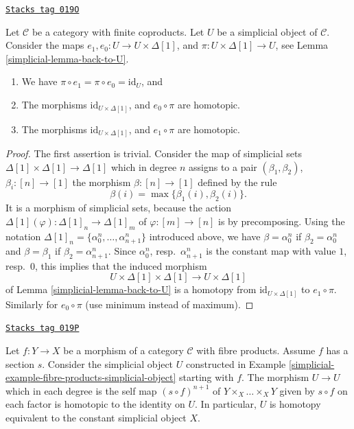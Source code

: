 \begin{lemma}[Contractible]
\label{simplicial-lemma-contractible}
\href{https://stacks.math.columbia.edu/tag/019O}{\texttt{Stacks tag 019O}}

Let $\mathcal{C}$ be a category with finite coproducts.
Let $U$ be a simplicial object of $\mathcal{C}$.
Consider the maps $e_1, e_0 : U \to U \times \Delta[1]$,
and $\pi : U \times \Delta[1] \to U$, see
Lemma \ref{simplicial-lemma-back-to-U}.
\begin{enumerate}
\item We have $\pi \circ e_1 = \pi \circ e_0 = \text{id}_U$, and
\item The morphisms $\text{id}_{U \times \Delta[1]}$,
and $e_0 \circ \pi$ are homotopic.
\item The morphisms $\text{id}_{U \times \Delta[1]}$,
and $e_1 \circ \pi$ are homotopic.
\end{enumerate}
\end{lemma}

\begin{proof}

The first assertion is trivial. Consider the map of simplicial sets
$\Delta[1] \times \Delta[1] \longrightarrow \Delta[1]$
which in degree $n$ assigns to a pair $(\beta_1, \beta_2)$,
$\beta_i : [n] \to [1]$ the morphism
$\beta : [n] \to [1]$ defined by the rule
$$
\beta(i) = \max\{\beta_1(i), \beta_2(i)\}.
$$
It is a morphism of simplicial sets, because the action
$\Delta[1](\varphi) : \Delta[1]_n \to \Delta[1]_m$
of $\varphi : [m] \to [n]$ is by precomposing.
Using the notation $\Delta[1]_n = \{\alpha^n_0, \ldots, \alpha^n_{n + 1}\}$
introduced above, we have $\beta = \alpha^n_0$ if $\beta_2 = \alpha^n_0$
and $\beta = \beta_1$ if $\beta_2 = \alpha^n_{n + 1}$.
Since $\alpha^n_0$, resp.\ $\alpha^n_{n + 1}$ is the constant map
with value $1$, resp.\ $0$, this implies that the induced morphism
$$
U \times \Delta[1] \times \Delta[1]
\longrightarrow
U \times \Delta[1]
$$
of Lemma \ref{simplicial-lemma-back-to-U}
is a homotopy from $\text{id}_{U \times \Delta[1]}$ to $e_1 \circ \pi$.
Similarly for $e_0 \circ \pi$ (use minimum instead of maximum).
\end{proof}

\begin{lemma}
\label{simplicial-lemma-fibre-products-simplicial-object-w-section}
\href{https://stacks.math.columbia.edu/tag/019P}{\texttt{Stacks tag 019P}}

Let $f : Y \to X$ be a morphism of a category $\mathcal{C}$ with
fibre products. Assume $f$ has a section $s$. Consider the
simplicial object $U$ constructed in
Example \ref{simplicial-example-fibre-products-simplicial-object}
starting with $f$. The morphism $U \to U$ which in each degree
is the self map $(s \circ f)^{n + 1}$ of $Y \times_X \ldots \times_X Y$
given by $s \circ f$ on each factor is homotopic to the identity on $U$.
In particular, $U$ is homotopy equivalent to the constant
simplicial object $X$.
\end{lemma}

